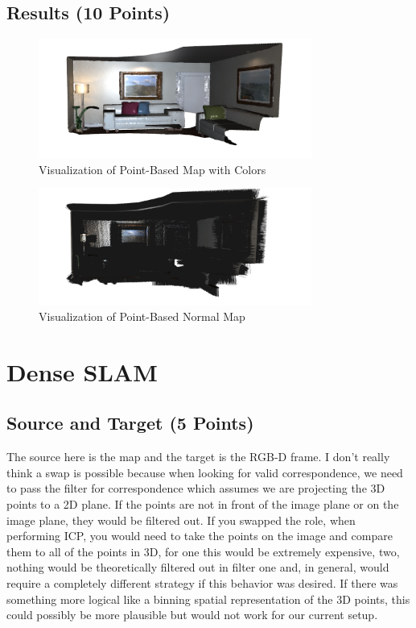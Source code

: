 \documentclass[12pt, a4paper]{article}
\begin{document}
\subsection{Results (10 Points)}
\begin{figure}[!htb]
    \centering
    \includegraphics[width=0.8\textwidth]{FusionVis.PNG}
    \caption{Visualization of Point-Based Map with Colors}
\end{figure}
\begin{figure}[!htb]
    \centering
    \includegraphics[width=0.8\textwidth]{NormalMap.PNG}
    \caption{Visualization of Point-Based Normal Map}
\end{figure}

\clearpage
\section{Dense SLAM}
\subsection{Source and Target (5 Points)}
The source here is the map and the target is the RGB-D frame. I don't really think a swap is possible because when looking for valid correspondence, we need to pass the filter for correspondence which assumes we are projecting the 3D points to a 2D plane. If the points are not in front of the image plane or on the image plane, they would be filtered out. If you swapped the role, when performing ICP, you would need to take the points on the image and compare them to all of the points in 3D, for one this would be extremely expensive, two, nothing would be theoretically filtered out in filter one and, in general, would require a completely different strategy if this behavior was desired. If there was something more logical like a binning spatial representation of the 3D points, this could possibly be more plausible but would not work for our current setup.
\end{document}
